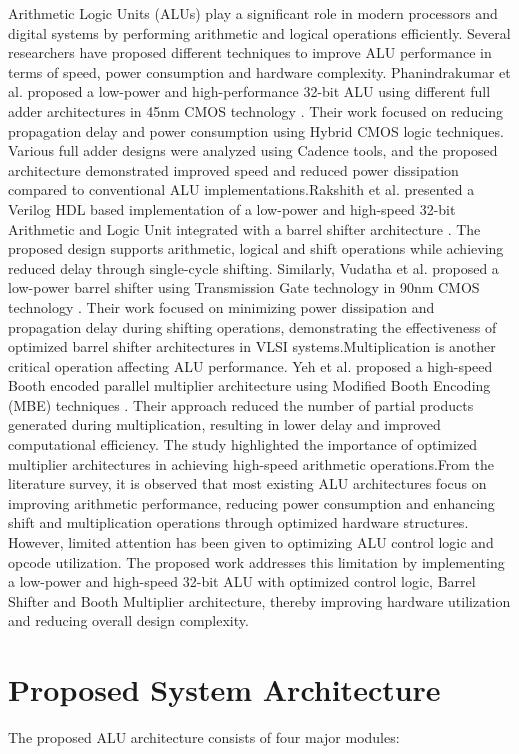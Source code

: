 \documentclass[conference]{IEEEtran}
\begin{document}
Arithmetic Logic Units (ALUs) play a significant role in modern processors and digital systems by performing arithmetic and logical operations efficiently. Several researchers have proposed different techniques to improve ALU performance in terms of speed, power consumption and hardware complexity. Phanindrakumar et al. proposed a low-power and high-performance 32-bit ALU using different full adder architectures in 45nm CMOS technology \cite{ref1}. Their work focused on reducing propagation delay and power consumption using Hybrid CMOS logic techniques. Various full adder designs were analyzed using Cadence tools, and the proposed architecture demonstrated improved speed and reduced power dissipation compared to conventional ALU implementations.Rakshith et al. presented a Verilog HDL based implementation of a low-power and high-speed 32-bit Arithmetic and Logic Unit integrated with a barrel shifter architecture \cite{ref2}. The proposed design supports arithmetic, logical and shift operations while achieving reduced delay through single-cycle shifting. Similarly, Vudatha et al. proposed a low-power barrel shifter using Transmission Gate technology in 90nm CMOS technology \cite{ref3}. Their work focused on minimizing power dissipation and propagation delay during shifting operations, demonstrating the effectiveness of optimized barrel shifter architectures in VLSI systems.Multiplication is another critical operation affecting ALU performance. Yeh et al. proposed a high-speed Booth encoded parallel multiplier architecture using Modified Booth Encoding (MBE) techniques \cite{ref4}. Their approach reduced the number of partial products generated during multiplication, resulting in lower delay and improved computational efficiency. The study highlighted the importance of optimized multiplier architectures in achieving high-speed arithmetic operations.From the literature survey, it is observed that most existing ALU architectures focus on improving arithmetic performance, reducing power consumption and enhancing shift and multiplication operations through optimized hardware structures. However, limited attention has been given to optimizing ALU control logic and opcode utilization. The proposed work addresses this limitation by implementing a low-power and high-speed 32-bit ALU with optimized control logic, Barrel Shifter and Booth Multiplier architecture, thereby improving hardware utilization and reducing overall design complexity.
\section{Proposed System Architecture}
The proposed ALU architecture consists of four major modules:
\end{document}
